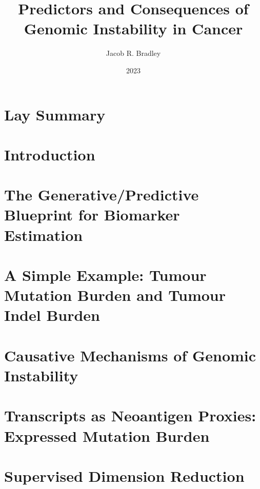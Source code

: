 \documentclass[10pt,twoside,openright]{report}
\title{Predictors and Consequences of Genomic Instability in Cancer}
\author{Jacob R. Bradley}
\date{2023}
\newcommand{\dobib}{
}
\begin{document}
\renewcommand{\dobib}{} %

\maketitle

\declaration

\dedication{To Morton...}



\chapter*{Lay Summary}
\label{chap:laysummary}



\printglossary[type=\acronymtype]

\tableofcontents

\chapter{Introduction}




\chapter{The Generative/Predictive Blueprint for Biomarker Estimation}



\chapter{A Simple Example: Tumour Mutation Burden and Tumour Indel Burden}



\chapter{Causative Mechanisms of Genomic Instability}



\chapter{Transcripts as Neoantigen Proxies: Expressed Mutation Burden}






\appendix

\chapter{Supervised Dimension Reduction}

\end{document}

